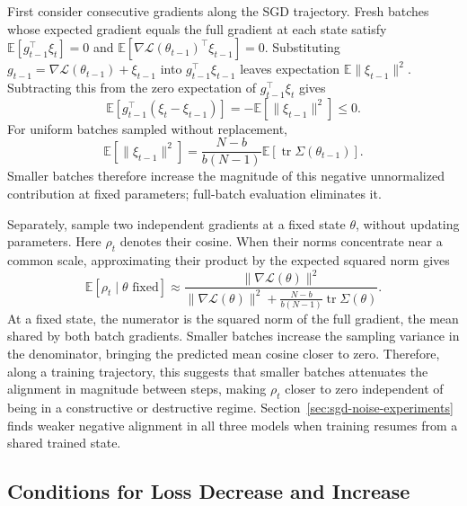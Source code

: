 First consider consecutive gradients along the SGD trajectory. Fresh batches whose expected gradient equals the full gradient at each state satisfy $\mathbb E[g_{t-1}^\top\xi_t]=0$ and $\mathbb E[\nabla\mathcal L(\theta_{t-1})^\top\xi_{t-1}]=0$. Substituting $g_{t-1}=\nabla\mathcal L(\theta_{t-1})+\xi_{t-1}$ into $g_{t-1}^{\top}\xi_{t-1}$ leaves expectation $\mathbb E\|\xi_{t-1}\|^2$. Subtracting this from the zero expectation of $g_{t-1}^{\top}\xi_t$ gives
\begin{equation}
  \mathbb E[g_{t-1}^\top(\xi_t-\xi_{t-1})]
  =-\mathbb E[\|\xi_{t-1}\|^2]\leq0.
  \label{eq:noise-expectation}
\end{equation}
For uniform batches sampled without replacement,
\begin{equation}
  \mathbb E[\|\xi_{t-1}\|^2]
  =\frac{N-b}{b(N-1)}
    \mathbb E[\operatorname{tr}\Sigma(\theta_{t-1})].
  \label{eq:finite-population-noise}
\end{equation}
Smaller batches therefore increase the magnitude of this negative unnormalized contribution at fixed parameters; full-batch evaluation eliminates it.

Separately, sample two independent gradients at a fixed state $\theta$, without updating parameters. Here $\rho_t$ denotes their cosine. When their norms concentrate near a common scale, approximating their product by the expected squared norm gives
\begin{equation}
  \mathbb E[\rho_t\mid\theta\text{ fixed}]\approx
  \frac{\|\nabla\mathcal L(\theta)\|^2}
  {\|\nabla\mathcal L(\theta)\|^2+
   \frac{N-b}{b(N-1)}\operatorname{tr}\Sigma(\theta)}.
  \label{eq:noise-cosine-approx}
\end{equation}
At a fixed state, the numerator is the squared norm of the full gradient, the mean shared by both batch gradients. Smaller batches increase the sampling variance in the denominator, bringing the predicted mean cosine closer to zero. Therefore, along a training trajectory, this suggests that smaller batches attenuates the alignment in magnitude between steps, making $\rho_t$ closer to zero independent of being in a constructive or destructive regime. Section~\ref{sec:sgd-noise-experiments} finds weaker negative alignment in all three models when training resumes from a shared trained state.

\subsection{Conditions for Loss Decrease and Increase}
\label{subsec:loss-connection}\label{subsec:loss}


